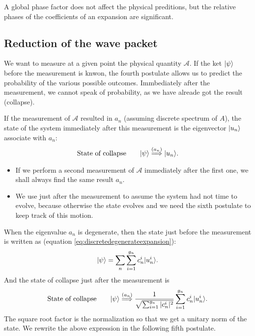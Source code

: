 \begin{emphasizer}
    A global phase factor does not affect the physical preditions, but the relative phases of the coefficients of an expansion are significant.
\end{emphasizer}

%
\subsection{Reduction of the wave packet}
We want to measure at a given point the physical quantity $\mathcal{A}$. If the ket $|\psi\rangle$ before the measurement is knwon, the fourth postulate
allows us to predict the probability of the various possible outcomes. Immbediately after the measurement, we cannot speak of probability, as we have 
alreade got the result (collapse).

If the measurement of $\mathcal{A}$ resulted in $a_n$ (assuming discrete spectrum of $A$), the state of the system immediately after this measurement is the eigenvector $|u_n\rangle$ associate with $a_n$:
\begin{align}
    \text{State of collapse}\qquad|\psi\rangle\stackrel{(a_n)}{\Longrightarrow}|u_n\rangle.
\end{align}
\begin{itemize}[itemsep=0pt,topsep=0pt]
    \item If we perform a second measurement of $\mathcal{A}$ immediately after the first one, we shall always find the same result $a_n$.
    \item We use just after the measurement to assume the system had not time to evolve, because otherwise the state evolves and we need the sixth postulate to keep track of this motion.
\end{itemize}

When the eigenvalue $a_n$ is degenerate, then the state just before the measurement is written as (equation \eqref{eq:discretedegenerateexpansion}):
\begin{align*}
    |\psi\rangle=\sum_n\sum_{i=1}^{g_n}c_n^i|u_n^i\rangle.
\end{align*}
And the state of collapse just after the measurement is 
\begin{align}
    \text{State of collapse}\qquad\displaystyle|\psi\rangle\stackrel{(a_n)}{\Longrightarrow}\frac{1}{\sqrt{\sum_{i=1}^{g_n}|c_n^i|^2}}\sum_{i=1}^{g_n}c_n^i|u_n^i\rangle.
\end{align}
The square root factor is the normalization so that we get a unitary norm of the state. We rewrite the above expression in the following fifth postulate.

